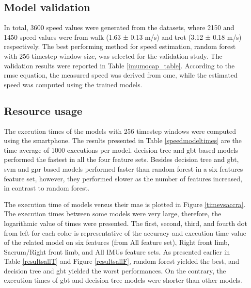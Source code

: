 


\subsection{Model validation}
In total, 3600 speed values were generated from the datasets, where 2150 and 1450 speed values were from walk (1.63 ± 0.13 m/s) and trot (3.12 ± 0.18 m/s) respectively. The best performing method for speed estimation, random forest with 256 timestep window size, was selected for the validation study. The validation results were reported in Table \ref{imumocap_table}. According to the \gls{rmse} equation, the measured speed was derived from \gls{omc}, while the estimated speed was computed using the trained models.




\subsection{Resource usage}

The execution times of the models with 256 timestep windows were computed using the smartphone. The results presented in Table \ref{speedmodeltimes} are the time average of 1000 executions per model. decision tree and \gls{gbt} based models performed the fastest in all the four feature sets. Besides decision tree and \gls{gbt}, \gls{svm} and \gls{gpr} based models performed faster than random forest in a six features feature set, however, they performed slower as the number of features increased, in contrast to random forest.  



The execution time of models versus their \gls{mae} is plotted in Figure \ref{timevsaccra}. The execution times between some models were very large, therefore, the logarithmic value of times were presented. The first, second, third, and fourth dot from left for each color is representative of the accuracy and execution time value of the related model on six features (from All feature set), Right front limb, Sacrum/Right front limb, and All IMUs feature sets. As presented earlier in Table \ref{resultsallT} and Figure \ref{resultsallF},  random forest yielded the best, and decision tree and \gls{gbt} yielded the worst performances. On the contrary, the execution times of \gls{gbt} and decision tree models were shorter than other models.

